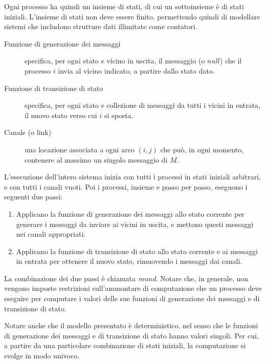 \documentclass[italian,]{book}
\begin{document}
Ogni processo ha quindi un insieme di stati, di cui un sottoinsieme è di
stati iniziali. L'insieme di stati non deve essere finito, permettendo
quindi di modellare sistemi che includono strutture dati illimitate come
contatori.

\begin{description}
\item[Funzione di generazione dei messaggi]
specifica, per ogni stato e vicino in uscita, il messaggio (o \(null\))
che il processo \(i\) invia al vicino indicato, a partire dallo stato
dato.
\item[Funzione di transizione di stato]
specifica, per ogni stato e collezione di messaggi da tutti i vicini in
entrata, il nuovo stato verso cui \(i\) si sposta.
\item[Canale (o link)]
una locazione associata a ogni arco \((i,j)\) che può, in ogni momento,
contenere al massimo un singolo messaggio di \(M\).
\end{description}

L'esecuzione dell'intero sistema inizia con tutti i processi in stati
iniziali arbitrari, e con tutti i canali vuoti. Poi i processi, insieme
e passo per passo, eseguono i seguenti due passi:

\begin{enumerate}
\def\labelenumi{\arabic{enumi}.}
\item
  Applicano la funzione di generazione dei messaggi allo stato corrente
  per generare i messaggi da inviare ai vicini in uscita, e mettono
  questi messaggi nei canali appropriati.
\item
  Applicano la funzione di transizione di stato allo stato corrente e ai
  messaggi in entrata per ottenere il nuovo stato, rimuovendo i messaggi
  dai canali.
\end{enumerate}

La combinazione dei due passi è chiamata \emph{round}. Notare che, in
generale, non vengono imposte restrizioni sull'ammontare di computazione
che un processo deve eseguire per computare i valori delle sue funzioni
di generazione dei messaggi e di transizione di stato.

Notare anche che il modello presentato è deterministico, nel senso che
le funzioni di generazione dei messaggi e di transizione di stato hanno
valori singoli. Per cui, a partire da una particolare combinazione di
stati iniziali, la computazione si svolge in modo univoco.
\end{document}
